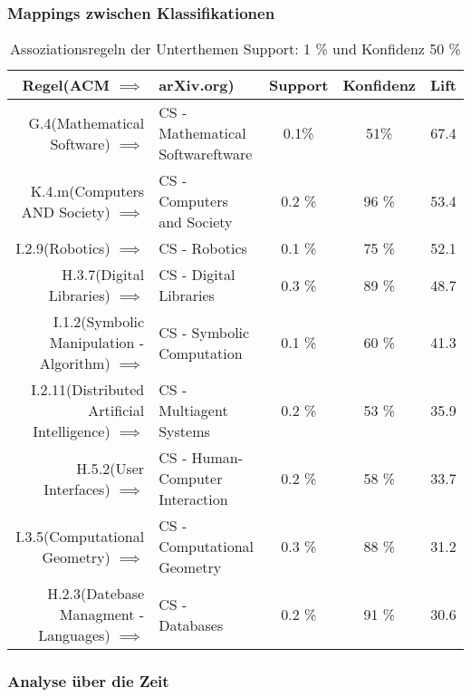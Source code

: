 \subsubsection{Mappings zwischen Klassifikationen}
\begin{table}[H]
\centering %
\begin{tabular}{|rl|c|c|c|}
	\hline
	\textbf{Regel(ACM $\implies$ }  &\textbf{arXiv.org)} & {Support} &\textbf{Konfidenz} & \textbf{Lift}\\
	\hline
	\small G.4(Mathematical Software) $\implies$ & \small CS - Mathematical Softwareftware & 0.1\% &51\% &67.4  \\
	\small K.4.m(Computers AND Society) $\implies$ & \small CS - Computers and Society &0.2 \% &96 \%  &53.4 \\
	\small I.2.9(Robotics) $\implies$ & \small CS - Robotics &0.1 \% & 75 \%  &52.1 \\
	\small H.3.7(Digital Libraries) $\implies$ & \small CS - Digital Libraries &0.3 \% &89 \% &48.7 \\
	\small I.1.2(Symbolic Manipulation - Algorithm) $\implies$ & \small CS - Symbolic Computation  &0.1 \% &60 \%  &41.3 \\
	\small I.2.11(Distributed Artificial Intelligence) $\implies$ & \small CS - Multiagent Systems  &0.2 \% &53 \%  &35.9 \\
	\small H.5.2(User Interfaces) $\implies$ & \small CS - Human-Computer Interaction &0.2 \% &58 \%  &33.7 \\
	\small I.3.5(Computational Geometry) $\implies$ & \small CS - Computational Geometry &0.3 \% &88 \%  &31.2 \\
	\small H.2.3(Datebase Managment - Languages) $\implies$ & \small CS - Databases &0.2 \% &91 \%  &30.6 \\
	\hline
\end{tabular}
 \caption{Assoziationsregeln der Unterthemen Support: 1 \% und Konfidenz 50 \%}
\end{table}
\subsubsection{Analyse über die Zeit}
